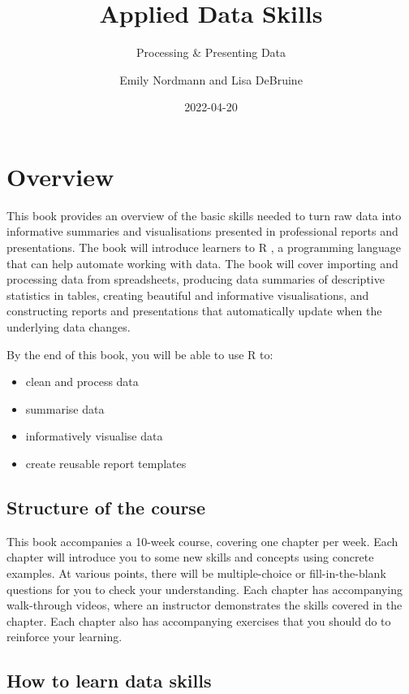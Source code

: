 \documentclass[
]{book}
\title{Applied Data Skills}
\subtitle{Processing \& Presenting Data}
\author{Emily Nordmann and Lisa DeBruine}
\date{2022-04-20}
\providecommand{\tightlist}{%
  \setlength{\itemsep}{0pt}\setlength{\parskip}{0pt}}
\begin{document}
\maketitle

{
\setcounter{tocdepth}{1}
\tableofcontents
}
\hypertarget{overview}{%
\chapter*{Overview}\label{overview}}

This book provides an overview of the basic skills needed to turn raw data into informative summaries and visualisations presented in professional reports and presentations. The book will introduce learners to R \citep{R-base}, a programming language that can help automate working with data. The book will cover importing and processing data from spreadsheets, producing data summaries of descriptive statistics in tables, creating beautiful and informative visualisations, and constructing reports and presentations that automatically update when the underlying data changes.

By the end of this book, you will be able to use R to:

\begin{itemize}
\tightlist
\item
  clean and process data
\item
  summarise data
\item
  informatively visualise data
\item
  create reusable report templates
\end{itemize}

\hypertarget{structure-of-the-course}{%
\section{Structure of the course}\label{structure-of-the-course}}

This book accompanies a 10-week course, covering one chapter per week. Each chapter will introduce you to some new skills and concepts using concrete examples. At various points, there will be multiple-choice or fill-in-the-blank questions for you to check your understanding. Each chapter has accompanying walk-through videos, where an instructor demonstrates the skills covered in the chapter. Each chapter also has accompanying exercises that you should do to reinforce your learning.

\hypertarget{how-to-learn-data-skills}{%
\section{How to learn data skills}\label{how-to-learn-data-skills}}
\end{document}
